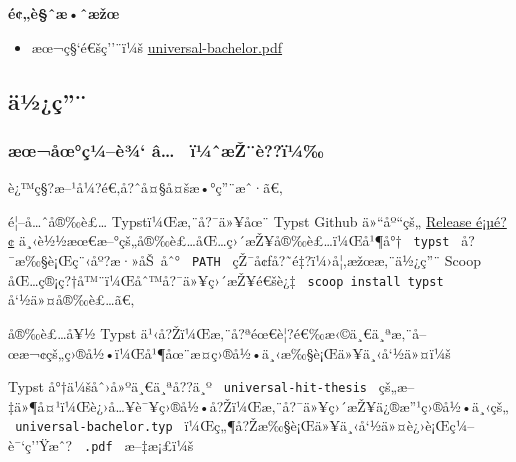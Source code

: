 \textbf{é¢„è§ˆæ•ˆæžœ}

\begin{itemize}
\tightlist
\item
  æœ¬ç§`é€šç''¨ï¼š
  \href{https://github.com/chosertech/HIT-Thesis-Typst/blob/build/universal-bachelor.pdf}{universal-bachelor.pdf}
\end{itemize}

\subsection{ä½¿ç''¨}\label{uxe4uxbduxe7}

\subsubsection{æœ¬åœ°ç¼--è¾` â\ldots~
ï¼ˆæŽ¨è??ï¼‰}\label{uxe6ux153uxe5ux153uxe7uxbcuxe8uxbe-uxe2-uxefuxbcux2c6uxe6ux17euxe8uxefuxbc}

è¿™ç§?æ--¹å¼?é€‚å?ˆå¤§å¤šæ•°ç''¨æˆ·ã€‚

é¦--å\ldots ˆå®‰è£\ldots{} Typstï¼Œæ‚¨å?¯ä»¥åœ¨ Typst Github ä»``åº``çš„
\href{https://github.com/typst/typst/releases/}{Release é¡µé?¢}
ä¸‹è½½æœ€æ--°çš„å®‰è£\ldots åŒ\ldots ç›´æŽ¥å®‰è£\ldots ï¼Œå¹¶å°†
\texttt{\ typst\ } å?¯æ‰§è¡Œç¨‹åº?æ·»åŠ~åˆ° \texttt{\ PATH\ }
çŽ¯å¢ƒå?˜é‡?ï¼›å¦‚æžœæ‚¨ä½¿ç''¨ Scoop
åŒ\ldots ç®¡ç?†å™¨ï¼Œåˆ™å?¯ä»¥ç›´æŽ¥é€šè¿‡
\texttt{\ scoop\ install\ typst\ } å`½ä»¤å®‰è£\ldots ã€‚

å®‰è£\ldots å¥½ Typst
ä¹‹å?Žï¼Œæ‚¨å?ªéœ€è¦?é€‰æ‹©ä¸€ä¸ªæ‚¨å--œæ¬¢çš„ç›®å½•ï¼Œå¹¶åœ¨æ­¤ç›®å½•ä¸‹æ‰§è¡Œä»¥ä¸‹å`½ä»¤ï¼š

\begin{Shaded}
\begin{Highlighting}[]
\end{Highlighting}
\end{Shaded}

Typst å°†ä¼šåˆ›å»ºä¸€ä¸ªå??ä¸º \texttt{\ universal-hit-thesis\ }
çš„æ--‡ä»¶å¤¹ï¼Œè¿›å\ldots¥è¯¥ç›®å½•å?Žï¼Œæ‚¨å?¯ä»¥ç›´æŽ¥ä¿®æ''¹ç›®å½•ä¸‹çš„
\texttt{\ universal-bachelor.typ\ }
ï¼Œç„¶å?Žæ‰§è¡Œä»¥ä¸‹å`½ä»¤è¿›è¡Œç¼--è¯`ç''Ÿæˆ? \texttt{\ .pdf\ }
æ--‡æ¡£ï¼š

\begin{Shaded}
\begin{Highlighting}[]
\end{Highlighting}
\end{Shaded}

